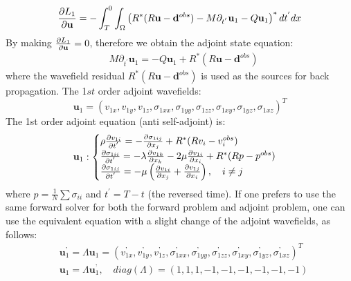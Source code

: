\documentclass[pdftex,a4paper,parskip,listof=totoc,bibliography=totoc,onehalfspacing,12pt]{scrreprt}
\begin{document}
\begin{equation}
 \pdv{L_1}{\mathbf{u}} = -\int_T^0 \int_\Omega \left( R^{*}(R\mathbf{u} - \mathbf{d}^{obs}) - M \partial_{t^{'}} \mathbf{u}_{1} - Q \mathbf{u}_{1} \right)^{*} dt^{'} dx
\end{equation}
By making $\pdv{L_1}{\mathbf{u}} = 0$, therefore we obtain the adjoint state equation:
\begin{equation}
\begin{aligned}
\label{eqn:AdjointEquation1}
& M \partial_{t^{'}} \mathbf{u}_{1} = -Q \mathbf{u}_{1} + R^{*}(R\mathbf{u} - \mathbf{d}^{obs})
\end{aligned}
\end{equation}
where the wavefield residual $R^{*}(R\mathbf{u} - \mathbf{d}^{obs}) $ is used as the sources for back propagation. The 1$st$ order adjoint wavefields:
\begin{equation}
\mathbf{ u}_1=\left(v_{1x},v_{1y},v_{1z},\sigma_{1xx},\sigma_{1yy},\sigma_{1zz},\sigma_{1xy},\sigma_{1yz},\sigma_{1xz}\right)^T
\end{equation}
The 1st order adjoint equation (anti self-adjoint) is:
\begin{equation}
\label{eqn:AdjointEquation11}
\mathbf{u}_{1}:
\begin{cases}
\rho\pdv{v_{1i}}{t^{'}}=-\pdv{\sigma_{1ij}}{x_j} + R^{*}(R v_i -v_i^{obs})\\
\pdv{\sigma_{1ii}}{t^{'}} = -\lambda \pdv{v_{1k}}{x_k} - 2\mu \pdv{v_{1i}}{x_i} + R^{*}(R p - p^{obs})\\
\pdv{\sigma_{1ij}}{t^{'}} = -\mu \left(\pdv{v_{1i}}{x_j} +\pdv{v_{1j}}{x_i}\right), \quad i \neq j
\end{cases}
\end{equation}
where $p=\frac{1}{N} \sum \sigma_{ii}$ and $t^{'}=T-t$ (the reversed time).
If one prefers to use the same forward solver for both the forward problem and adjoint problem, one can use the equivalent equation with a slight change of the adjoint wavefields, as follows:
\begin{equation}
\begin{align}
&\mathbf{u}_{1}^{’} = \varLambda \mathbf{u}_{1} = \left(v_{1x}^{’},v_{1y}^{’},v_{1z}^{’},\sigma_{1xx}^{’},\sigma_{1yy}^{’},\sigma_{1zz}^{’},\sigma_{1xy}^{’},\sigma_{1yz}^{’},\sigma_{1xz}^{’}\right)^T \\
&\mathbf{u}_{1} = \varLambda \mathbf{u}_{1}^{’}, \quad diag(\varLambda) = \left(1,1,1,-1,-1,-1,-1,-1,-1 \right)
\end{align}
\end{equation}
\end{document}
